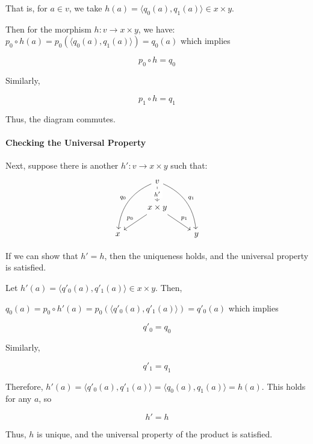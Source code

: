 \documentclass[uplatex,a4j,12pt,dvipdfmx]{jsarticle}
\begin{document}
That is, for $a \in v$, we take $h(a) = \langle q_{0}(a) , q_{1}(a) \rangle \in x \times y$.

Then for the morphism $h : v \to x \times y$, we have:
$p_{0} \circ h(a) = p_{0} (\langle q_{0}(a) , q_{1}(a) \rangle) = q_{0}(a)$
which implies

$$p_{0} \circ h = q_{0}$$

Similarly,

$$p_{1} \circ h = q_{1}$$

Thus, the diagram commutes.

\paragraph{Checking the Universal Property}

Next, suppose there is another $h':v \to x \times y$ such that:
\[
	\begin{tikzcd}
		& v \arrow[ldd, "q_{0}"', bend right] \arrow[rdd, "q_{1}", bend left] \arrow[d, "h'" description, dashed] &\\
		& x \times y \arrow[ld, "p_{0}"'] \arrow[rd, "p_{1}"]&\\
		x && y
	\end{tikzcd}
\]

If we can show that $h'=h$, then the uniqueness holds, and the universal property is satisfied.

Let $h'(a) = \langle q'_{0}(a) , q'_{1}(a) \rangle \in x \times y$. Then,

$q_{0}(a) = p_{0} \circ h'(a) = p_{0} (\langle q'_{0}(a) , q'_{1}(a) \rangle) = q'_{0}(a)$
which implies

$$q'_{0} = q_{0}$$

Similarly,

$$q'_{1} = q_{1}$$

Therefore,
$h'(a) = \langle q'_{0}(a) , q'_{1}(a) \rangle = \langle q_{0}(a) , q_{1}(a) \rangle = h(a)$.
This holds for any $a$, so

$$h' = h$$

Thus, $h$ is unique, and the universal property of the product is satisfied.
\end{document}

